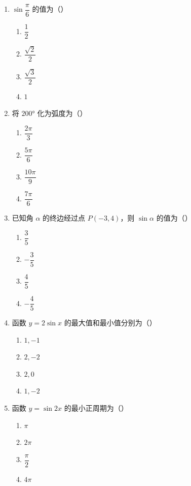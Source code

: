 \documentclass[12pt, a4paper]{ctexart}
\begin{document}
\begin{enumerate}
\item $\sin\dfrac{\pi}{6}$ 的值为（\quad）
  \begin{enumerate}[label=\Alph*., itemsep=0pt]
    \item $\dfrac{1}{2}$ \quad \item $\dfrac{\sqrt{2}}{2}$ \quad \item $\dfrac{\sqrt{3}}{2}$ \quad \item $1$
  \end{enumerate}

\item 将 $200°$ 化为弧度为（\quad）
  \begin{enumerate}[label=\Alph*., itemsep=0pt]
    \item $\dfrac{2\pi}{3}$ \quad \item $\dfrac{5\pi}{6}$ \quad \item $\dfrac{10\pi}{9}$ \quad \item $\dfrac{7\pi}{6}$
  \end{enumerate}

\item 已知角 $\alpha$ 的终边经过点 $P(-3,4)$，则 $\sin\alpha$ 的值为（\quad）
  \begin{enumerate}[label=\Alph*., itemsep=0pt]
    \item $\dfrac{3}{5}$ \quad \item $-\dfrac{3}{5}$ \quad \item $\dfrac{4}{5}$ \quad \item $-\dfrac{4}{5}$
  \end{enumerate}

\item 函数 $y=2\sin x$ 的最大值和最小值分别为（\quad）
  \begin{enumerate}[label=\Alph*., itemsep=0pt]
    \item $1,-1$ \quad \item $2,-2$ \quad \item $2,0$ \quad \item $1,-2$
  \end{enumerate}

\item 函数 $y=\sin 2x$ 的最小正周期为（\quad）
  \begin{enumerate}[label=\Alph*., itemsep=0pt]
    \item $\pi$ \quad \item $2\pi$ \quad \item $\dfrac{\pi}{2}$ \quad \item $4\pi$
  \end{enumerate}


\end{enumerate}
\end{document}
